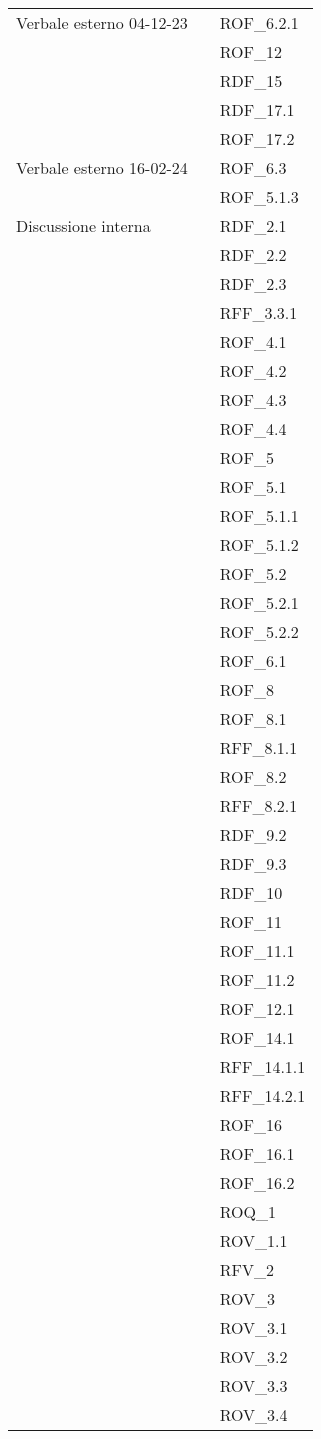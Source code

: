 \begin{xltabular}{\textwidth}{ p{0.3\textwidth} | X | p{0.2\textwidth} }
    Verbale esterno 04-12-23 & & ROF\_6.2.1\\
    &&ROF\_12\\
    &&RDF\_15\\
    &&RDF\_17.1\\
    &&ROF\_17.2\\


     Verbale esterno 16-02-24 & & ROF\_6.3\\
    &&ROF\_5.1.3\\


    Discussione interna & & RDF\_2.1\\ 
    &&RDF\_2.2\\ 
    &&RDF\_2.3\\ 
    &&RFF\_3.3.1\\ 
    &&ROF\_4.1\\ 
    &&ROF\_4.2\\ 
    &&ROF\_4.3\\ 
    &&ROF\_4.4\\ 
    &&ROF\_5\\ 
    &&ROF\_5.1\\ 
    &&ROF\_5.1.1\\ 
    &&ROF\_5.1.2\\ 
    &&ROF\_5.2\\ 
    &&ROF\_5.2.1\\ 
    &&ROF\_5.2.2\\ 
    &&ROF\_6.1\\ 
    &&ROF\_8\\ 
    &&ROF\_8.1\\ 
    &&RFF\_8.1.1\\ 
    &&ROF\_8.2\\ 
    &&RFF\_8.2.1\\ 
    &&RDF\_9.2\\ 
    &&RDF\_9.3\\ 
    &&RDF\_10\\ 
    &&ROF\_11\\ 
    &&ROF\_11.1\\ 
    &&ROF\_11.2\\ 
    &&ROF\_12.1\\ 
    &&ROF\_14.1\\ 
    &&RFF\_14.1.1\\ 
    &&RFF\_14.2.1\\ 
    &&ROF\_16\\ 
    &&ROF\_16.1\\ 
    &&ROF\_16.2\\ 
    &&ROQ\_1\\ 
    &&ROV\_1.1\\ 
    &&RFV\_2\\ 
    &&ROV\_3\\ 
    &&ROV\_3.1\\ 
    &&ROV\_3.2\\ 
    &&ROV\_3.3\\ 
    &&ROV\_3.4\\ 



\end{xltabular}
